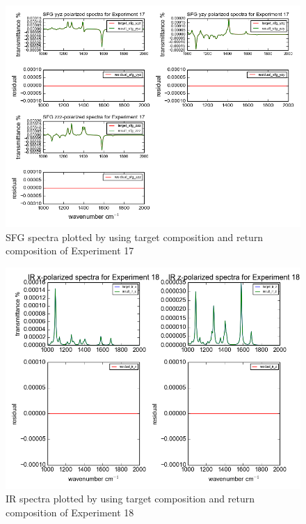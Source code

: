 \begin{figure}[!ht]
\centering
\includegraphics[scale=0.7]{Figures/chapter4_result_target_plotting_5datapoint_sfg.png}
\caption{SFG spectra plotted by using target composition and return composition of Experiment 17}  \label{fig:4.4}
\end{figure}

\begin{figure}[!ht] 
\centering
\includegraphics[scale=0.7]{Figures/chapter4_result_target_plotting_500datapoint_ir.png}
\caption{IR spectra plotted by using target composition and return composition of Experiment 18} \label{fig:4.5}
\end{figure}


